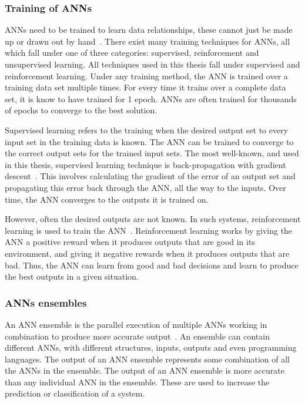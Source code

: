 \subsubsection{Training of \acfp{ANN}}
\acp{ANN} need to be trained to learn data relationships, these cannot just be made up or drawn out by hand~\cite{ann-train}.
There exist many training techniques for \acp{ANN}, all which fall under one of three categories: supervised, reinforcement and unsupervised learning.
All techniques used in this thesis fall under supervised and reinforcement learning.
Under any training method, the \ac{ANN} is trained over a training data set multiple times. 
For every time it trains over a complete data set, it is know to have trained for 1 epoch.
\acp{ANN} are often trained for thousands of epochs to converge to the best solution.

Supervised learning refers to the training when the desired output set to every input set in the training data is known.
The \ac{ANN} can be trained to converge to the correct output sets for the trained input sets.
The most well-known, and used in this thesis, supervised learning technique is back-propagation with gradient descent~\cite{grad-desc}.
This involves calculating the gradient of the error of an output set and propagating this error back through the \ac{ANN}, all the way to the inputs.
Over time, the \ac{ANN} converges to the outputs it is trained on.

However, often the desired outputs are not known.
In such systems, reinforcement learning is used to train the \ac{ANN}~\cite{reinforcement-learning}.
Reinforcement learning works by giving the \ac{ANN} a positive reward when it produces outputs that are good in its environment, and giving it negative rewards when it produces outputs that are bad. 
Thus, the \ac{ANN} can learn from good and bad decisions and learn to produce the best outputs in a given situation.

\subsubsection{\acfp{ANN} ensembles}
An \ac{ANN} ensemble is the parallel execution of multiple \acp{ANN} working in combination to produce more accurate output~\cite{Maqsood2004}.
An ensemble can contain different \acp{ANN}, with different structures, inputs, outputs and even programming languages.
The output of an \ac{ANN} ensemble represents some combination of all the \acp{ANN} in the ensemble.
The output of an \ac{ANN} ensemble is more accurate than any individual \ac{ANN} in the ensemble.
These are used to increase the prediction or classification of a system.

